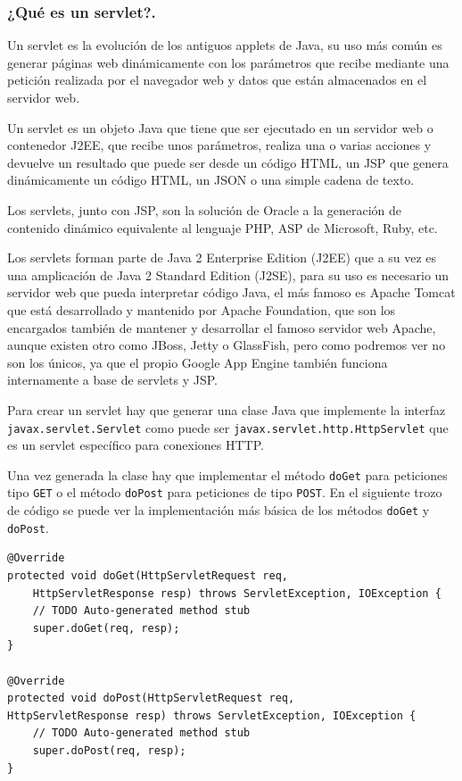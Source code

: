 \begin{itemize}
\subsubsection{¿Qué es un servlet?.}
Un servlet es la evolución de los antiguos applets de Java, su uso más común es generar páginas web dinámicamente con los parámetros que recibe mediante una petición realizada por el navegador web y datos que están almacenados en el servidor web.

Un servlet es un objeto Java que tiene que ser ejecutado en un servidor web o contenedor J2EE, que recibe unos parámetros, realiza una o varias acciones y devuelve un resultado que puede ser desde un código HTML, un JSP que genera dinámicamente un código HTML, un JSON o una simple cadena de texto.

Los servlets, junto con JSP, son la solución de Oracle a la generación de contenido dinámico equivalente al lenguaje PHP, ASP de Microsoft, Ruby, etc.

Los servlets forman parte de Java 2 Enterprise Edition (J2EE) que a su vez es una amplicación de Java 2 Standard Edition (J2SE), para su uso es necesario un servidor web que pueda interpretar código Java, el más famoso es Apache Tomcat que está desarrollado y mantenido por Apache Foundation, que son los encargados también de mantener y desarrollar el famoso servidor web Apache, aunque existen otro como JBoss, Jetty o GlassFish, pero como podremos ver no son los únicos, ya que el propio Google App Engine también funciona internamente a base de servlets y JSP.

Para crear un servlet hay que generar una clase Java que implemente la interfaz \lstinline{javax.servlet.Servlet} como puede ser \lstinline{javax.servlet.http.HttpServlet} que es un servlet específico para conexiones HTTP.
 
Una vez generada la clase hay que implementar el método \lstinline{doGet} para peticiones tipo \lstinline{GET} o el método \lstinline{doPost} para peticiones de tipo \lstinline{POST}. En el siguiente trozo de código se puede ver la implementación más básica de los métodos \lstinline{doGet} y \lstinline{doPost}.

\begin{lstlisting}[style=Java] 
@Override
protected void doGet(HttpServletRequest req, 
	HttpServletResponse resp) throws ServletException, IOException {
	// TODO Auto-generated method stub
	super.doGet(req, resp);
}

@Override
protected void doPost(HttpServletRequest req, 
HttpServletResponse resp) throws ServletException, IOException {
	// TODO Auto-generated method stub
	super.doPost(req, resp);
}
\end{lstlisting}


\end{itemize}

